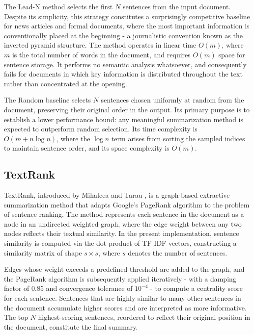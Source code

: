 \documentclass[12pt,twoside,en,win]{bmzhart}
\begin{document}
	The Lead-N method selects the first $N$ sentences from the input document. Despite its simplicity, this strategy 
	constitutes a surprisingly competitive baseline for news articles and formal documents, where the most important 
	information is conventionally placed at the beginning - a journalistic convention known as the inverted pyramid 
	structure. The method operates in linear time $O(m)$, where $m$ is the total number of words in the document, 
	and requires $O(m)$ space for sentence storage. It performs no semantic analysis whatsoever, and consequently 
	fails for documents in which key information is distributed throughout the text rather than concentrated at 
	the opening.

	The Random baseline selects $N$ sentences chosen uniformly at random from the document, preserving their 
	original order in the output. Its primary purpose is to establish a lower performance bound: any meaningful 
	summarization method is expected to outperform random selection. Its time complexity is $O(m + n \log n)$, 
	where the $\log n$ term arises from sorting the sampled indices to maintain sentence order, and its space 
	complexity is $O(m)$.

	\subsection{TextRank}

	TextRank, introduced by Mihalcea and Tarau \cite{k2}, is a graph-based extractive summarization method that adapts 
	Google's PageRank algorithm to the problem of sentence ranking. The method represents each sentence in the 
	document as a node in an undirected weighted graph, where the edge weight between any two nodes reflects their 
	textual similarity. In the present implementation, sentence similarity is computed via the dot product of TF-IDF 
	vectors, constructing a similarity matrix of shape $s \times s$, where $s$ denotes the number of sentences.

	Edges whose weight exceeds a predefined threshold are added to the graph, and the PageRank algorithm is 
	subsequently applied iteratively - with a damping factor of $0.85$ and convergence tolerance of $10^{-4}$ - 
	to compute a centrality score for each sentence. Sentences that are highly similar to many other sentences in 
	the document accumulate higher scores and are interpreted as more informative. The top $N$ highest-scoring 
	sentences, reordered to reflect their original position in the document, constitute the final summary.
\end{document}

